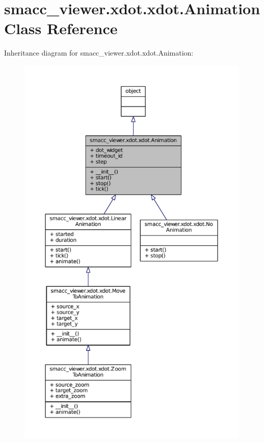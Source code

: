 \hypertarget{classsmacc__viewer_1_1xdot_1_1xdot_1_1Animation}{}\section{smacc\+\_\+viewer.\+xdot.\+xdot.\+Animation Class Reference}
\label{classsmacc__viewer_1_1xdot_1_1xdot_1_1Animation}


Inheritance diagram for smacc\+\_\+viewer.\+xdot.\+xdot.\+Animation\+:
\nopagebreak
\begin{figure}[H]
\begin{center}
\leavevmode
\includegraphics[height=550pt]{classsmacc__viewer_1_1xdot_1_1xdot_1_1Animation__inherit__graph}
\end{center}
\end{figure}


